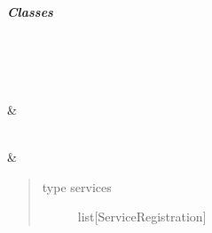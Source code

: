 \documentclass[letterpaper,10pt,english]{sphinxmanual}
\begin{document}
\subparagraph{Classes}
\label{\detokenize{autoapi/pine/pipelines/app/listener/service_listener/index:classes}}

\begin{savenotes}\sphinxatlongtablestart\begin{longtable}[c]{}
\hline

\endfirsthead

%
{}\\
\hline

\endhead

\hline
{}\\
\endfoot

\endlastfoot

\sphinxAtStartPar
{\hyperref[\detokenize{autoapi/pine/pipelines/app/listener/service_listener/index:pine.pipelines.app.listener.service_listener.ServiceRegistration}]{}}
&
\sphinxAtStartPar

\\
\hline
\sphinxAtStartPar
{\hyperref[\detokenize{autoapi/pine/pipelines/app/listener/service_listener/index:pine.pipelines.app.listener.service_listener.ServiceListener}]{}}
&
\sphinxAtStartPar
\begin{quote}\begin{description}
\item[{type services}] \leavevmode
\sphinxAtStartPar
list{[}ServiceRegistration{]}

\end{description}\end{quote}

\\
\hline
\end{longtable}\sphinxatlongtableend\end{savenotes}

\begin{fulllineitems}
\label{\detokenize{autoapi/pine/pipelines/app/listener/service_listener/index:pine.pipelines.app.listener.service_listener.config}}
\end{fulllineitems}
\end{document}
